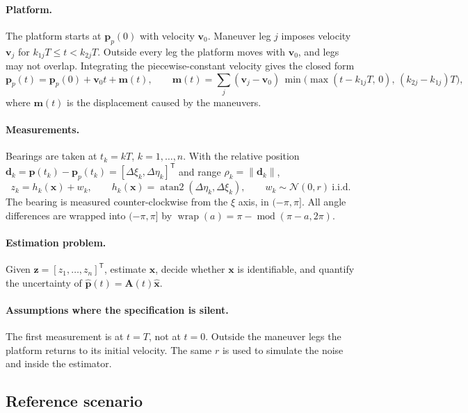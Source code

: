 \documentclass[11pt,a4paper]{article}
\newcommand{\x}{\bm{x}}
\newcommand{\xh}{\hat{\bm{x}}}
\newcommand{\z}{\bm{z}}
\newcommand{\p}{\bm{p}}
\newcommand{\vv}{\bm{v}}
\newcommand{\dd}{\bm{d}}
\newcommand{\m}{\bm{m}}
\newcommand{\T}{^{\mathsf{T}}}
\newcommand{\Am}{\bm{A}}
\newcommand{\Normal}{\mathcal{N}}
\DeclareMathOperator{\atantwo}{atan2}
\DeclareMathOperator{\wrap}{wrap}
\theoremstyle{plain}
\theoremstyle{remark}
\begin{document}
\paragraph{Platform.} The platform starts at $\p_p(0)$ with velocity
$\vv_0$. Maneuver leg $j$ imposes velocity $\vv_j$ for
$k_{1j}T \le t < k_{2j}T$. Outside every leg the platform moves with $\vv_0$,
and legs may not overlap. Integrating the piecewise-constant velocity gives
the closed form
\begin{equation}
  \p_p(t) = \p_p(0) + \vv_0 t + \m(t), \qquad
  \m(t) = \sum_j (\vv_j - \vv_0)\,
          \min\!\big(\max(t - k_{1j}T,\,0),\,(k_{2j}-k_{1j})T\big),
  \label{eq:platform}
\end{equation}
where $\m(t)$ is the displacement caused by the maneuvers.

\paragraph{Measurements.} Bearings are taken at $t_k = kT$, $k=1,\dots,n$.
With the relative position
$\dd_k = \p(t_k)-\p_p(t_k) = [\Delta\xi_k,\Delta\eta_k]\T$ and range
$\rho_k=\|\dd_k\|$,
\begin{equation}
  z_k = h_k(\x) + w_k, \qquad h_k(\x) = \atantwo(\Delta\eta_k, \Delta\xi_k),
  \qquad w_k \sim \Normal(0, r)\ \text{i.i.d.}
  \label{eq:meas}
\end{equation}
The bearing is measured counter-clockwise from the $\xi$ axis, in
$(-\pi,\pi]$. All angle differences are wrapped into $(-\pi,\pi]$ by
$\wrap(a)=\pi-\operatorname{mod}(\pi-a,2\pi)$.

\paragraph{Estimation problem.} Given $\z=[z_1,\dots,z_n]\T$, estimate $\x$,
decide whether $\x$ is identifiable, and quantify the uncertainty of
$\hat{\p}(t)=\Am(t)\xh$.

\paragraph{Assumptions where the specification is silent.}
The first measurement is at $t=T$, not at $t=0$. Outside the maneuver legs
the platform returns to its initial velocity. The same $r$ is used to
simulate the noise and inside the estimator.

\subsection{Reference scenario}
\end{document}
